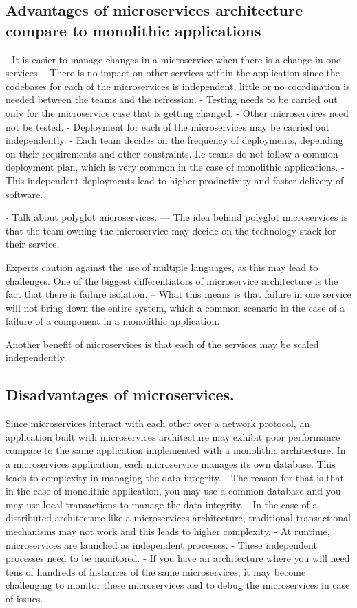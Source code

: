 \subsection{Advantages of microservices architecture compare to monolithic applications}
\begin{itemize}
    - It is easier to manage changes in a microservice when there is a change in one services.
    - There is no impact on other services within the application since the codebases for each of the microservices is independent, little or no coordination is needed between the teams and the refression.
    - Testing needs to be carried out only for the microservice case that is getting changed.
    - Other microservices need not be tested.
    - Deployment for each of the microservices may be carried out independently.
    - Each team decides on the frequency of deployments, depending on their requirements and other constraints. I.e teams do not follow a common deployment plan, which is very common in the case of monolithic applications.
    - This independent deployments lead to higher productivity and faster delivery of software.
\end{itemize}
- Talk about polyglot microservices.
--- The idea behind polyglot microservices is that the team owning the microservice may decide on the technology stack for their service.

Experts caution against the use of multiple languages, as this may lead to challenges.
One of the biggest differentiators of microservice architecture is the fact that there is failure isolation.
-- What this means is that failure in one service will not bring down the entire system, which a common scenario in the case of a failure of a component in a monolithic application.

Another benefit of microservices is that each of the services may be scaled independently.

\subsection{Disadvantages of microservices.}
Since microservices interact with each other over a network protocol, an application built with microservices architecture may exhibit poor performance compare to the same application implemented with a monolithic architecture.
In a microservices application, each microservice manages its own database.
This leads to complexity in managing the data integrity.
- The reason for that is that in the case of monolithic application, you may use a common database and you may use local transactions to manage the data integrity.
- In the case of a distributed architecture like a microservices architecture, traditional transactional mechanisms may not work and this leads to higher complexity.
- At runtime, microservices are launched as independent processes.
- These independent processes need to be monitored.
- If you have an architecture where you will need tens of hundreds of instances of the same microservices, it may become challenging to monitor these microservices and to debug the microservices in case of issues.

